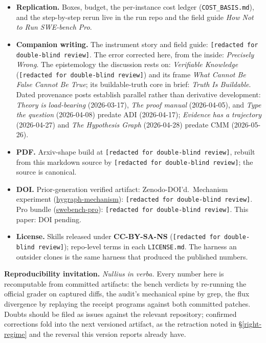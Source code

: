 \documentclass[
  10pt,
]{article}
\begin{document}
\begin{itemize}
  \texttt{[redacted]}.
\item
  \textbf{Replication.} Boxes, budget, the per-instance cost ledger
  (\texttt{COST\_BASIS.md}), and the step-by-step rerun live in the run
  repo and the field guide \emph{How Not to Run SWE-bench Pro}.
\item
  \textbf{Companion writing.} The instrument story and field guide:
  \texttt{[redacted for double-blind review]}. The error corrected here, from the inside:
  \emph{Precisely Wrong}. The epistemology the discussion rests on:
  \emph{Verifiable Knowledge}
  (\texttt{[redacted for double-blind review]}) and its frame
  \emph{What Cannot Be False Cannot Be True}; its buildable-truth core
  in brief: \emph{Truth Is Buildable}. Dated provenance posts establish
  parallel rather than derivative development: \emph{Theory is
  load-bearing} (2026-03-17), \emph{The proof manual} (2026-04-05), and
  \emph{Type the question} (2026-04-08) predate ADI (2026-04-17);
  \emph{Evidence has a trajectory} (2026-04-27) and \emph{The Hypothesis
  Graph} (2026-04-28) predate CMM (2026-05-26).
\item
  \textbf{PDF.} Arxiv-shape build at
  \texttt{[redacted for double-blind review]},
  rebuilt from this markdown source by
  \texttt{[redacted for double-blind review]}; the source is
  canonical.
\item
  \textbf{DOI.} Prior-generation verified artifact:
  Zenodo-DOI'd.~Mechanism experiment
  (\href{https://anonymous.4open.science/r/hymech-117E}{hygraph-mechanism}):
  \texttt{[redacted for double-blind review]}.
  Pro bundle
  (\href{https://anonymous.4open.science/r/wepro-3D87}{swebench-pro}):
  \texttt{[redacted for double-blind review]}.
  This paper: DOI pending.
\item
  \textbf{License.} Skills released under \textbf{CC-BY-SA-NS}
  (\texttt{[redacted for double-blind review]});
  repo-level terms in each \texttt{LICENSE.md}. The harness an outsider
  clones is the same harness that produced the published numbers.
\end{itemize}

\textbf{Reproducibility invitation.} \emph{Nullius in verba.} Every
number here is recomputable from committed artifacts: the bench verdicts
by re-running the official grader on captured diffs, the audit's
mechanical spine by grep, the flux divergence by replaying the receipt
programs against both committed patches. Doubts should be filed as
issues against the relevant repository; confirmed corrections fold into
the next versioned artifact, as the retraction noted in
\S\ref{right-regime} and the reversal this version reports already have.
\end{document}
